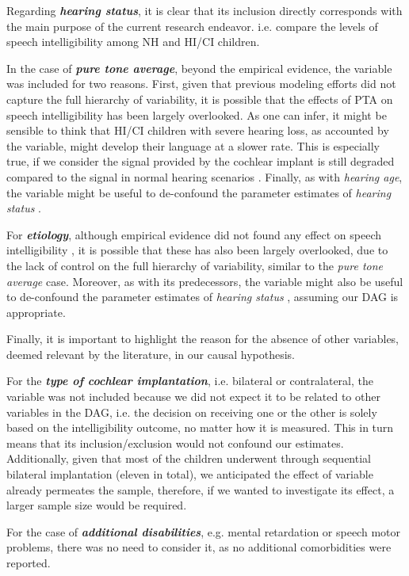 Regarding \textbf{\textit{hearing status}}, it is clear that its inclusion directly corresponds with the main purpose of the current research endeavor. i.e. compare the levels of speech intelligibility among NH and HI/CI children.

In the case of \textbf{\textit{pure tone average}}, beyond the empirical evidence, the variable was included for two reasons. First, given that previous modeling efforts did not capture the full hierarchy of variability, it is possible that the effects of PTA on speech intelligibility has been largely overlooked. As one can infer, it might be sensible to think that HI/CI children with severe hearing loss, as accounted by the variable, might develop their language at a slower rate. This is especially true, if we consider the signal provided by the cochlear implant is still degraded compared to the signal in normal hearing scenarios \cite{Drennan_et_al_2008}. Finally, as with \textit{hearing age}, the variable might be useful to de-confound the parameter estimates of \textit{hearing status} \cite{Cinelli_et_al_2021}.

For \textbf{\textit{etiology}}, although empirical evidence did not found any effect on speech intelligibility \cite{Boonen_et_al_2021}, it is possible that these has also been largely overlooked, due to the lack of control on the full hierarchy of variability, similar to the \textit{pure tone average} case. Moreover, as with its predecessors, the variable might also be useful to de-confound the parameter estimates of \textit{hearing status} \cite{Cinelli_et_al_2021}, assuming our DAG is appropriate.

Finally, it is important to highlight the reason for the absence of other variables, deemed relevant by the literature, in our causal hypothesis.

For the \textbf{\textit{type of cochlear implantation}}, i.e. bilateral or contralateral, the variable was not included because we did not expect it to be related to other variables in the DAG, i.e. the decision on receiving one or the other is solely based on the intelligibility outcome, no matter how it is measured. This in turn means that its inclusion/exclusion would not confound our estimates. Additionally, given that most of the children underwent through sequential bilateral implantation (eleven in total), we anticipated the effect of variable already permeates the sample, therefore, if we wanted to investigate its effect, a larger sample size would be required.

For the case of \textbf{\textit{additional disabilities}}, e.g. mental retardation or speech motor problems, there was no need to consider it, as no additional comorbidities were reported.


